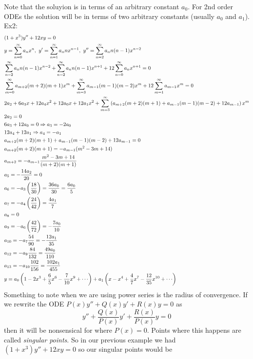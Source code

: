 \documentclass[11pt, fleqn]{article}
\begin{document}
Note that the soluyion is in terms of an arbitrary constant $a_0$. For 2nd order ODEs the solution will be in terms of two arbitrary constants (usually $a_0$ and $a_1$).\\
Ex2:
\begin{align*}
    &(1+x^3)y''+12xy=0\\
    &y=\sum_{n=0}^\infty a_nx^n,\ y'=\sum_{n=1}^\infty a_nnx^{n-1},\ y''=\sum_{n=2}^\infty a_nn(n-1)x^{n-2}\\
    &\sum_{n=2}^\infty a_nn(n-1)x^{n-2}+\sum_{n=2}^\infty a_nn(n-1)x^{n+1}+12\sum_{n=0}^\infty a_nx^{n+1}=0\\
    &\sum_{m=0}^\infty a_{m+2}(m+2)(m+1)x^m+\sum_{m=3}^\infty a_{m-1}(m-1)(m-2)x^m+12\sum_{m=1}^\infty a_{m-1}x^m=0\\
    &2a_2+6a_3x+12a_4x^2+12a_0x+12a_1x^2+\sum_{m=3}^\infty\brround{a_{m+2}(m+2)(m+1)+a_{m-1}(m-1)(m-2)+12a_{m-1}}x^m\\
    &2a_2=0\\
    &6a_3+12a_0=0\Ra a_3=-2a_0\\
    &12a_4+12a_1\Ra a_4=-a_1\\
    &a_{m+2}(m+2)(m+1)+a_{m-1}(m-1)(m-2)+12a_{m-1}=0\\
    &a_{m+2}(m+2)(m+1)=-a_{m-1}(m^2-3m+14)\\
    &a_{m+2}=-a_{m-1}\frac{m^2-3m+14}{(m+2)(m+1)}\\
    &a_5=-\frac{14a_2}{20}=0\\
    &a_6=-a_3\brround{\frac{18}{30}}=\frac{36a_0}{30}=\frac{6a_0}{5}\\
    &a_7=-a_4\brround{\frac{24}{42}}=\frac{4a_1}{7}\\
    &a_8=0\\
    &a_9=-a_6\brround{\frac{42}{72}}=-\frac{7a_0}{10}\\
    &a_{10}=-a_7\frac{54}{90}=-\frac{12a_1}{35}\\
    &a_{12}=-a_9\frac{84}{132}=\frac{49a_0}{110}\\
    &a_{13}=-a_{10}\frac{102}{156}=\frac{102a_1}{455}\\
    &y=a_0\brround{1-2x^3+\frac{6}{5}x^6-\frac{7}{10}x^9+\cdots}+a_1\brround{x-x^4+\frac{4}{7}x^7-\frac{12}{35}x^{10}+\cdots}
\end{align*}
Something to note when we are using power series is the radius of convergence. If we rewrite the ODE $P(x)y''+Q(x)y'+R(x)y=0$ as
$$y''+\frac{Q(x)}{P(x)}y'+\frac{R(x)}{P(x)}y=0$$
then it will be nonsensical for where $P(x)=0$. Points where this happens are called \textit{singular points}. So in our previous example we had $(1+x^3)y''+12xy=0$ so our singular points would be
\end{document}
